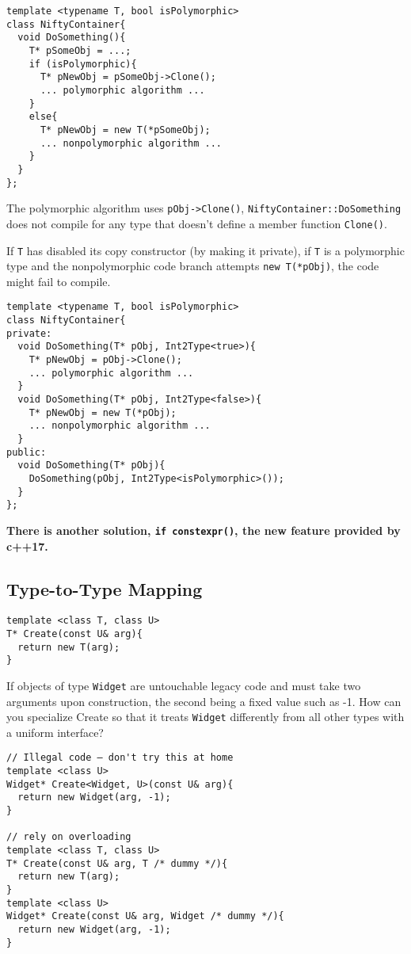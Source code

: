 \begin{verbatim}
template <typename T, bool isPolymorphic>
class NiftyContainer{
  void DoSomething(){
    T* pSomeObj = ...;
    if (isPolymorphic){
      T* pNewObj = pSomeObj->Clone();
      ... polymorphic algorithm ...
    }
    else{
      T* pNewObj = new T(*pSomeObj);
      ... nonpolymorphic algorithm ...
    }
  }
};
\end{verbatim}

The polymorphic algorithm uses \texttt{pObj->Clone()},
\texttt{NiftyContainer::DoSomething }does not compile for any type
that doesn't define a member function \texttt{Clone()}.

If \texttt{T} has disabled its copy constructor (by making it
private), if \texttt{T} is a polymorphic type and the nonpolymorphic
code branch attempts \texttt{new T(*pObj)}, the code might fail to
compile.

\begin{verbatim}
template <typename T, bool isPolymorphic>
class NiftyContainer{
private:
  void DoSomething(T* pObj, Int2Type<true>){
    T* pNewObj = pObj->Clone();
    ... polymorphic algorithm ...
  }
  void DoSomething(T* pObj, Int2Type<false>){
    T* pNewObj = new T(*pObj);
    ... nonpolymorphic algorithm ...
  }
public:
  void DoSomething(T* pObj){
    DoSomething(pObj, Int2Type<isPolymorphic>());
  }
};
\end{verbatim}

\textbf{There is another solution, \texttt{if constexpr()}, the new
  feature provided by c++17.}

\subsection{Type-to-Type Mapping}

\begin{verbatim}
template <class T, class U>
T* Create(const U& arg){
  return new T(arg);
}
\end{verbatim}

If objects of type \texttt{Widget} are untouchable legacy code and must
take two arguments upon construction, the second being a fixed value
such as -1. How can you specialize Create so that it treats \texttt{Widget}
differently from all other types with a uniform interface?

\begin{verbatim}
// Illegal code — don't try this at home
template <class U>
Widget* Create<Widget, U>(const U& arg){
  return new Widget(arg, -1);
}

// rely on overloading
template <class T, class U>
T* Create(const U& arg, T /* dummy */){
  return new T(arg);
}
template <class U>
Widget* Create(const U& arg, Widget /* dummy */){
  return new Widget(arg, -1);
}
\end{verbatim}

